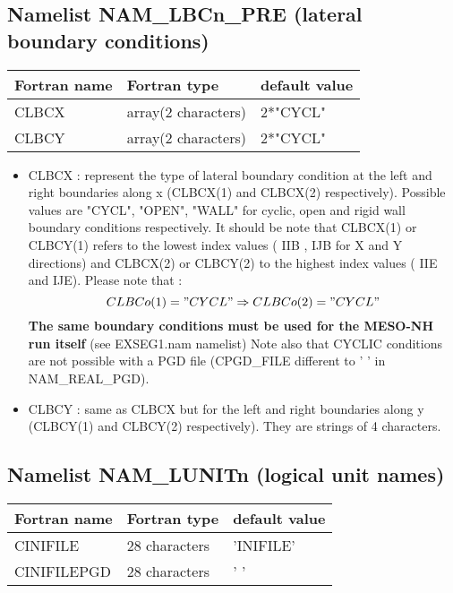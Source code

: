\subsection{Namelist NAM\_LBCn\_PRE (lateral boundary conditions)} 

\begin{center}
\begin{tabular} {|l|l|l|}
\hline
Fortran name & Fortran type & default value \\
\hline
CLBCX    & array(2 characters)  &  2*"CYCL"  \\
CLBCY    & array(2 characters)  &  2*"CYCL"  \\
\hline
\end{tabular}
\end{center}

\begin{itemize}

\item
CLBCX  : represent the type of lateral boundary
condition at the left and right boundaries along x (CLBCX(1) and CLBCX(2)
respectively). Possible values are "CYCL", "OPEN", "WALL" for cyclic, open and
rigid wall boundary conditions respectively. It should be note that CLBCX(1) or CLBCY(1)
refers to the lowest index values ( IIB , IJB for X and Y directions) and
CLBCX(2) or CLBCY(2) to the highest index values ( IIE  and IJE). Please note
that :  
$$CLBCo(1) ="CYCL" \Rightarrow CLBCo(2) ="CYCL" $$
  {\bf  The same boundary conditions must be used for the MESO-NH run itself} (see EXSEG1.nam namelist)
Note also that CYCLIC conditions are not possible  
with a PGD file (CPGD\_FILE different to '  ' in NAM\_REAL\_PGD).
\item
CLBCY  : same as CLBCX but for the left and right boundaries along y (CLBCY(1) and CLBCY(2) respectively). They are strings of 4 characters.
\end{itemize}  


\subsection{Namelist NAM\_LUNITn (logical unit names) }

\begin{center}
\begin{tabular} {|l|l|l|}
\hline
Fortran name & Fortran type & default value \\
\hline
CINIFILE     & 28 characters & 'INIFILE'\\
CINIFILEPGD  & 28 characters & ' '\\
\hline
\end{tabular}
\end{center}

